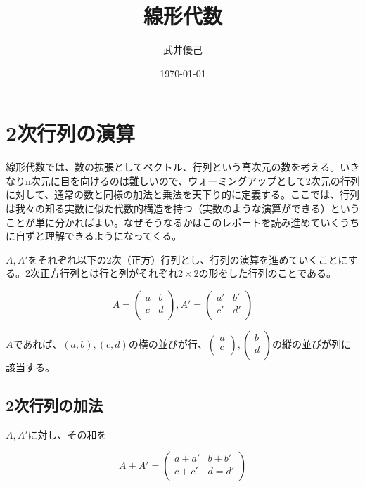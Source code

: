 \documentclass[dvipdfmx,autodetect-engine]{jsarticle}
\title{線形代数}
\author{武井優己}
\date{\today}
\begin{document}
\maketitle

\tableofcontents

\section{2次行列の演算}

線形代数では、数の拡張としてベクトル、行列という高次元の数を考える。いきなりn次元に目を向けるのは難しいので、ウォーミングアップとして2次元の行列に対して、通常の数と同様の加法と乗法を天下り的に定義する。ここでは、行列は我々の知る実数に似た代数的構造を持つ（実数のような演算ができる）ということが単に分かればよい。なぜそうなるかはこのレポートを読み進めていくうちに自ずと理解できるようになってくる。

$A, A'$をそれぞれ以下の2次（正方）行列とし、行列の演算を進めていくことにする。2次正方行列とは行と列がそれぞれ$2 \times 2$の形をした行列のことである。

$$
A = \begin{pmatrix}
a & b \\
c & d \\
\end{pmatrix},
A' = \begin{pmatrix}
a' & b' \\
c' & d' \\
\end{pmatrix}
$$

$A$であれば、$(a, b), (c, d)$の横の並びが行、$\begin{pmatrix}
a \\
c \\
\end{pmatrix}, \begin{pmatrix}
b \\
d \\
\end{pmatrix}$の縦の並びが列に該当する。


\subsection{2次行列の加法}

$A, A'$に対し、その和を

$$
A + A' = \begin{pmatrix}
a + a' & b + b' \\
c + c' & d = d'\\
\end{pmatrix}
$$
\end{document}
